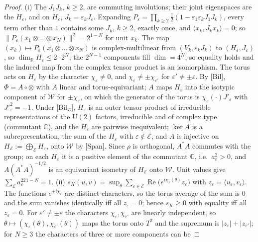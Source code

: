 \documentclass[aps,pra,onecolumn,superscriptaddress,nofootinbib,10pt]{revtex4-2}
\theoremstyle{definition}
\theoremstyle{remark}
\newcommand{\R}{\mathbb{R}}
\newcommand{\C}{\mathbb{C}}
\newcommand{\cL}{\mathcal{L}}
\newcommand{\re}{\operatorname{Re}}
\newcommand{\ip}[2]{\langle #1,#2\rangle}
\newcommand{\U}{\mathrm{U}}
\begin{document}
\begin{proof}
(i) The $J_1J_k$, $k\ge2$, are commuting involutions; their joint eigenspaces are the $H_\varepsilon$, and on $H_\varepsilon$,
$J_k=\varepsilon_kJ_\varepsilon$.  Expanding $P_\varepsilon=\prod_{k\ge2}\frac12(1-\varepsilon_1\varepsilon_kJ_1J_k)$, every term other than $1$
contains some $J_k$, $k\ge2$, exactly once, and $\ip{x_k}{J_kx_k}=0$; so $\lVert P_\varepsilon(x_1\otimes\dots\otimes x_N)\rVert^2=2^{1-N}$ for
unit $x_k$.  The map $(x_k)\mapsto P_\varepsilon(x_1\otimes\dots\otimes x_N)$ is complex-multilinear from $(V_k,\varepsilon_kJ_k)$ to
$(H_\varepsilon,J_\varepsilon)$, so $\dim_\R H_\varepsilon\le2\cdot2^N$; the $2^{N-1}$ components fill $\dim=4^N$, so equality holds
and the induced map from the complex tensor product is an isomorphism.  The torus acts on $H_\varepsilon$ by the
character $\chi_\varepsilon\ne0$, and $\chi_\varepsilon\ne\pm\chi_{\varepsilon'}$ for $\varepsilon'\ne\pm\varepsilon$.  By [Bil], $\Phi=A\circ\otimes$ with $A$ linear and
torus-equivariant; $A$ maps $H_\varepsilon$ into the isotypic component of $\mathcal W$ for $\pm\chi_\varepsilon$, on which the
generator of the torus is $\chi_\varepsilon(\cdot)J'_\varepsilon$ with $J'^2_\varepsilon=-1$.  Under [Bil$_\cL$], $H_\varepsilon$ is an outer tensor
product of irreducible representations of the $\U(2)$ factors, irreducible and of complex type
(commutant $\C$), and the $H_\varepsilon$ are pairwise inequivalent; $\ker A$ is a subrepresentation, the sum of the
$H_\varepsilon$ with $\varepsilon\notin\mathcal E$, and $A$ is injective on $H_{\mathcal E}:=\bigoplus_{\mathcal E}H_\varepsilon$, onto $\mathcal W$ by [Span].  Since
$\rho$ is orthogonal, $A^*A$ commutes with the group; on each $H_\varepsilon$ it is a positive element of the
commutant $\C$, i.e.\ $a_\varepsilon^2>0$, and $A(A^*A)^{-1/2}$ is an equivariant isometry of $H_{\mathcal E}$ onto $\mathcal W$.  Unit
values give $\sum_{\mathcal E}a_\varepsilon^22^{1-N}=1$.
(ii) $s_K(u,v)=\sup_\theta\sum_{\varepsilon\in\mathcal E}\re\bigl(e^{i\chi_\varepsilon(\theta)}z_\varepsilon\bigr)$ with $z_\varepsilon=\ip{u_\varepsilon}{v_\varepsilon}$.  The functions
$e^{\pm i\chi_\varepsilon}$ are distinct characters, so the torus average of the sum is $0$ and the sum vanishes
identically iff all $z_\varepsilon=0$; hence $s_K\ge0$ with equality iff all $z_\varepsilon=0$.  For $\varepsilon'\ne\pm\varepsilon$ the characters
$\chi_\varepsilon,\chi_{\varepsilon'}$ are linearly independent, so $\theta\mapsto(\chi_\varepsilon(\theta),\chi_{\varepsilon'}(\theta))$ maps the torus onto $T^2$ and
the supremum is $\lvert z_\varepsilon\rvert+\lvert z_{\varepsilon'}\rvert$; for $N\ge3$ the characters of three or more components can be

\end{proof}
\end{document}

